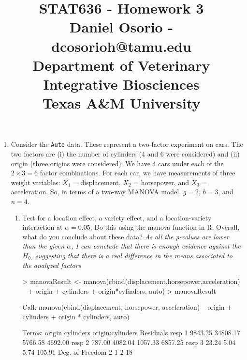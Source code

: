 \documentclass[12pt,a4paper]{paper}
\begin{document}
\title{STAT636 - Homework 3\\\small{Daniel Osorio - dcosorioh@tamu.edu\\Department of Veterinary Integrative Biosciences\\Texas A\&M University}}
\maketitle

\begin{enumerate}
\item Consider the \texttt{Auto} data. These represent a two-factor experiment on cars. The two factors are (i) the number of cylinders (4 and 6 were considered) and (ii) origin (three origins were considered). We have 4 cars under each of the $2 \times 3 = 6$ factor combinations. For each car, we have measurements of three weight variables: $X_{1}$ = displacement, $X_{2}$ = horsepower, and $X_{3}$ = acceleration. So, in terms of a two-way MANOVA model, $g = 2$, $b = 3$, and $n = 4$.
\begin{enumerate}
\begin{Schunk}
\begin{Sinput}
> auto<- read.csv("Auto_hw.csv")
> auto$cylinders <- as.factor(auto$cylinders)
> auto$origin <- as.factor(auto$origin)
\end{Sinput}
\end{Schunk}
\item Test for a location effect, a variety effect, and a location-variety interaction at $\alpha = 0.05$. Do this using the manova function in R. Overall, what do you conclude about these data? \textit{As all the p-values are lower than the given $\alpha$, I can conclude that there is enough evidence against the $H_{0}$, suggesting that there is a real difference in the means associated to the analyzed factors}
\begin{Schunk}
\begin{Sinput}
> manovaResult <- manova(cbind(displacement,horsepower,acceleration) ~ 
+                          origin + cylinders + origin*cylinders, auto)
> manovaResult
\end{Sinput}
\begin{Soutput}
Call:
   manova(cbind(displacement, horsepower, acceleration) ~ origin + 
    cylinders + origin * cylinders, auto)

Terms:
                  origin cylinders origin:cylinders Residuals
resp 1           9843.25  34808.17          5766.58   4692.00
resp 2            787.00   4082.04          1057.33   6857.25
resp 3             23.24      5.04             5.74    105.91
Deg. of Freedom        2         1                2        18


\end{Soutput}
\end{Schunk}
\end{enumerate}
\end{enumerate}
\end{document}
